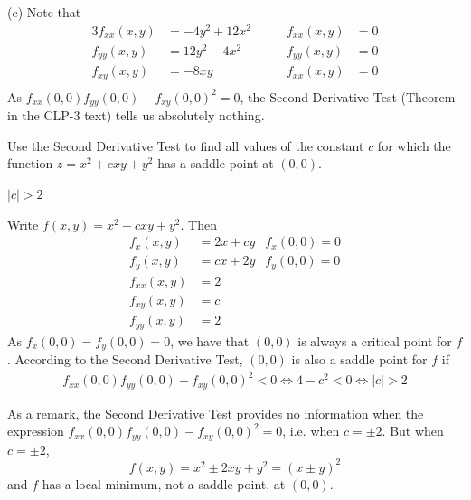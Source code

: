\begin{solution}
(c) 
Note that
\begin{alignat*}{3}
f_{xx}(x,y) &=-4y^2+12x^2\qquad&
         f_{xx}(x,y)&=0 \\
f_{yy}(x,y) &= 12y^2-4x^2\qquad&
         f_{yy}(x,y)&=0 \\
f_{xy}(x,y) &=-8xy\qquad&
         f_{xx}(x,y)&=0 \\
\end{alignat*}
As 
$
f_{xx}(0,0)f_{yy}(0,0)-f_{xy}(0,0)^2=0
$,
the Second Derivative Test (Theorem  
in the CLP-3 text) tells us absolutely nothing.
\end{solution}

\begin{question}[M200 2006A] %
Use the Second Derivative Test to find all values of the constant $c$ 
for which the function $z = x^2 + cxy + y^2$ has a saddle point at $(0,0)$.
\end{question}

%

\begin{answer}
$|c|>2$
\end{answer}

\begin{solution}
Write $f(x,y) = x^2 +cxy +y^2$. Then
\begin{align*}
f_x(x,y)&= 2x+cy & f_x(0,0) = 0 \\
f_y(x,y)&= cx+2y & f_y(0,0) = 0 \\
f_{xx}(x,y) &= 2 \\
f_{xy}(x,y) &= c \\
f_{yy}(x,y) &= 2
\end{align*}
As $f_x(0,0)=f_y(0,0)=0$, we have that $(0,0)$ is always a critical point
for $f$. According to the Second Derivative Test, $(0,0)$ is also a saddle point
for $f$ if
\begin{align*}
f_{xx}(0,0) f_{yy}(0,0) - f_{xy}(0,0)^2 <0
\iff 4-c^2 <0
\iff |c|>2
\end{align*}

As a remark, the Second Derivative Test provides no information 
when the expression
$f_{xx}(0,0) f_{yy}(0,0) - f_{xy}(0,0)^2 =0$, i.e. when $c=\pm 2$.
But when $c=\pm 2$,
\begin{equation*}
f(x,y) =  x^2 \pm 2xy + y^2 =(x\pm y)^2
\end{equation*}
and $f$ has a local minimum, not a saddle point, at $(0,0)$.
\end{solution}


